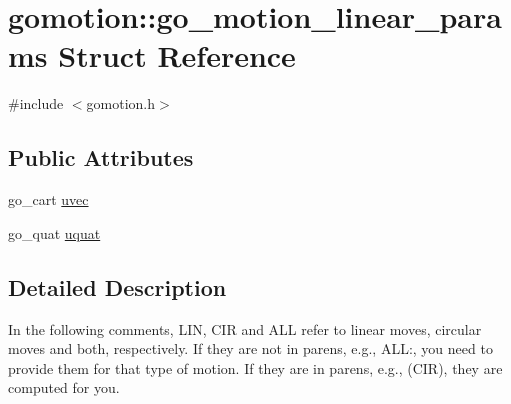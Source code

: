 \hypertarget{structgomotion_1_1go__motion__linear__params}{\section{gomotion\-:\-:go\-\_\-motion\-\_\-linear\-\_\-params Struct Reference}
\label{structgomotion_1_1go__motion__linear__params}
}


{\ttfamily \#include $<$gomotion.\-h$>$}

\subsection*{Public Attributes}
\begin{DoxyCompactItemize}
\item 
go\-\_\-cart \hyperlink{structgomotion_1_1go__motion__linear__params_ab1865f783998b55efb3c97f62e6a4f7d}{uvec}
\item 
go\-\_\-quat \hyperlink{structgomotion_1_1go__motion__linear__params_af354e180468997cc31fca9f21a9bc325}{uquat}
\end{DoxyCompactItemize}


\subsection{Detailed Description}
In the following comments, L\-I\-N, C\-I\-R and A\-L\-L refer to linear moves, circular moves and both, respectively. If they are not in parens, e.\-g., A\-L\-L\-:, you need to provide them for that type of motion. If they are in parens, e.\-g., (C\-I\-R), they are computed for you. 


